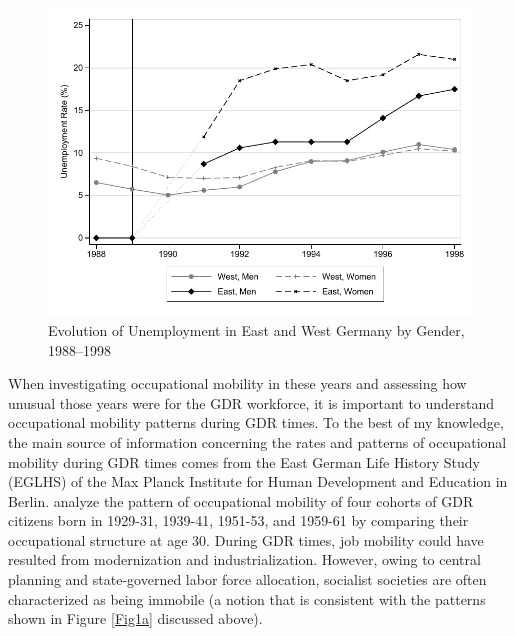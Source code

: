 \begin{Article}
\begin{refsection}[Spitz]
\begin{figure}[!ht]
    \caption{Evolution of Unemployment in East and West Germany by Gender, 1988--1998}
    \label{fig2}
    \centering
    \includegraphics[scale=0.8]{UE_ASO.pdf} 
\end{figure}

When investigating occupational mobility in these years and assessing how unusual those years were for the GDR workforce, it is important to understand occupational mobility patterns during GDR times. To the best of my knowledge, the main source of information concerning the rates and patterns of occupational mobility during GDR times comes from the East German Life History Study (EGLHS) of the Max Planck Institute for Human Development and Education in Berlin. \cite{HuininkSolga1994} analyze the pattern of occupational mobility of four cohorts of GDR citizens born in 1929-31, 1939-41, 1951-53, and 1959-61 by comparing their occupational structure at age 30. During GDR times, job mobility could have resulted from modernization and industrialization. However, owing to central planning and state-governed labor force allocation, socialist societies are often characterized as being immobile (a notion that is consistent with the patterns shown in Figure \ref{Fig1a} discussed above). 


\end{refsection}
\end{Article}
